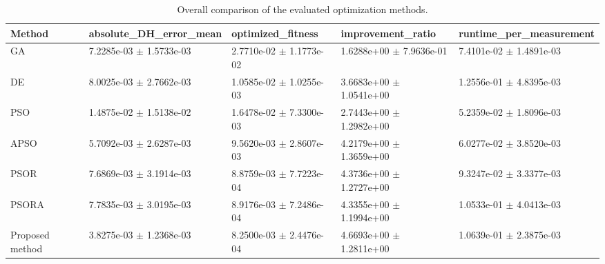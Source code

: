 \begin{table}
\caption{Overall comparison of the evaluated optimization methods.}
\label{tab:overall_results}
\begin{tabular}{lllll}
\toprule
Method & absolute_DH_error_mean & optimized_fitness & improvement_ratio & runtime_per_measurement \\
\midrule
GA & 7.2285e-03 $\pm$ 1.5733e-03 & 2.7710e-02 $\pm$ 1.1773e-02 & 1.6288e+00 $\pm$ 7.9636e-01 & 7.4101e-02 $\pm$ 1.4891e-03 \\
DE & 8.0025e-03 $\pm$ 2.7662e-03 & 1.0585e-02 $\pm$ 1.0255e-03 & 3.6683e+00 $\pm$ 1.0541e+00 & 1.2556e-01 $\pm$ 4.8395e-03 \\
PSO & 1.4875e-02 $\pm$ 1.5138e-02 & 1.6478e-02 $\pm$ 7.3300e-03 & 2.7443e+00 $\pm$ 1.2982e+00 & 5.2359e-02 $\pm$ 1.8096e-03 \\
APSO & 5.7092e-03 $\pm$ 2.6287e-03 & 9.5620e-03 $\pm$ 2.8607e-03 & 4.2179e+00 $\pm$ 1.3659e+00 & 6.0277e-02 $\pm$ 3.8520e-03 \\
PSOR & 7.6869e-03 $\pm$ 3.1914e-03 & 8.8759e-03 $\pm$ 7.7223e-04 & 4.3736e+00 $\pm$ 1.2727e+00 & 9.3247e-02 $\pm$ 3.3377e-03 \\
PSORA & 7.7835e-03 $\pm$ 3.0195e-03 & 8.9176e-03 $\pm$ 7.2486e-04 & 4.3355e+00 $\pm$ 1.1994e+00 & 1.0533e-01 $\pm$ 4.0413e-03 \\
Proposed method & 3.8275e-03 $\pm$ 1.2368e-03 & 8.2500e-03 $\pm$ 2.4476e-04 & 4.6693e+00 $\pm$ 1.2811e+00 & 1.0639e-01 $\pm$ 2.3875e-03 \\
\bottomrule
\end{tabular}
\end{table}
